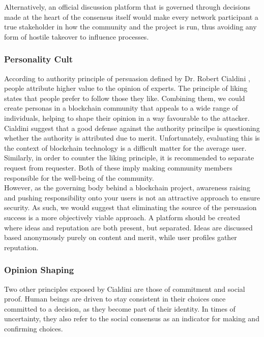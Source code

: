 \documentclass[12pt,a4paper]{article}
\begin{document}
Alternatively, an official discussion platform that is governed through decisions made at the heart of the consensus itself would make every network participant a true stakeholder in how the community and the project is run, thus avoiding any form of hostile takeover to influence processes.\\

\subsubsection{Personality Cult}

According to authority principle of persuasion defined by Dr. Robert Cialdini \cite{persuasion}, people attribute higher value to the opinion of experts. The principle of liking states that people prefer to follow those they like. Combining them, we could create personas in a blockchain community that appeals to a wide range of individuals, helping to shape their opinion in a way favourable to the attacker.\\

Cialdini suggest that a good defense against the authority princilpe is questioning whether the authority is attributed due to merit. Unfortunately, evaluating this is the context of blockchain technology is a difficult matter for the average user. Similarly, in order to counter the liking principle, it is recommended to separate request from requester. Both of these imply making community members responsible for the well-being of the community.\\

However, as the governing body behind a blockchain project, awareness raising and pushing responsibility onto your users is not an attractive approach to ensure security. As such, we would suggest that eliminating the source of the persuasion success is a more objectively viable approach. A platform should be created where ideas and reputation are both present, but separated. Ideas are discussed based anonymously purely on content and merit, while user profiles gather reputation.\\

\subsubsection{Opinion Shaping}

Two other principles exposed by Cialdini are those of commitment and social proof. Human beings are driven to stay consistent in their choices once committed to a decision, as they become part of their identity. In times of uncertainty, they also refer to the social consensus as an indicator for making and confirming choices.\\
\end{document}
